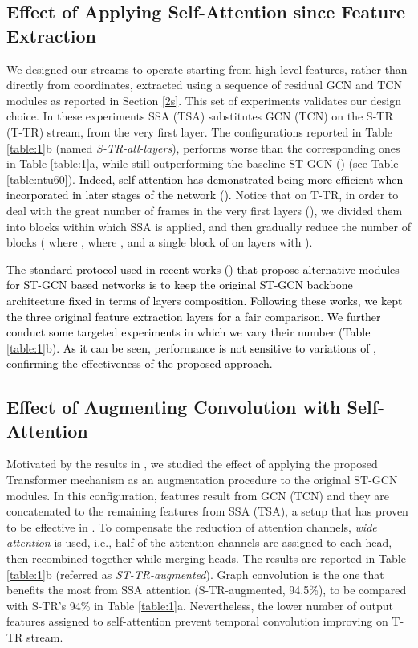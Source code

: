 \documentclass[times,twocolumn,final,authoryear]{elsarticle}
\DeclareRobustCommand{\new}[1]
{{\textcolor{black}{#1}}}
\begin{document}
\setlength{\tabcolsep}{4pt}




\subsection{Effect of Applying Self-Attention since Feature Extraction}
We designed our streams to operate starting from high-level features, rather than directly from coordinates, extracted using a sequence of residual GCN and TCN modules as reported in Section \ref{2s}. This set of experiments validates our design choice. In these experiments SSA (TSA) substitutes GCN (TCN) on the S-TR (T-TR) stream, from the very first layer. The configurations reported in Table \ref{table:1}b (named \textit{S-TR-all-layers}), performs worse than the corresponding ones in Table \ref{table:1}a, while still outperforming the baseline ST-GCN (\cite{dirgraph}) (see Table \ref{table:ntu60}). \new{Indeed, self-attention has demonstrated being more efficient when 
incorporated in later stages of the network (\cite{carion2020end,huang2019ccnet,non-local}).} 
Notice that on T-TR, in order to deal with the great number of frames in the very first layers (), we divided them into blocks within which SSA is applied, and then gradually reduce the number of blocks ( where ,  where , and a single block of  on layers  with ).


\new{The standard protocol used in recent works (\cite{shift,Shi2018TwoStreamAG}) that propose alternative modules for ST-GCN based networks is to keep the original ST-GCN backbone architecture fixed in terms of layers composition. Following these works, we kept the three original feature extraction layers for a fair comparison. We further conduct some targeted experiments in which we vary their number  (Table \ref{table:1}b). As it can be seen, performance is not sensitive to variations of , confirming the effectiveness of the proposed approach.}





\subsection{Effect of Augmenting Convolution with Self-Attention} 
Motivated by the results in \cite{DBLP:journals/corr/abs-1904-09925}, we studied the effect of applying the proposed Transformer mechanism as an augmentation procedure to the original ST-GCN modules. In this configuration,  features result from GCN (TCN) and they are concatenated to the remaining  features from SSA (TSA), a setup that
has proven to be effective in \cite{DBLP:journals/corr/abs-1904-09925}. To compensate the reduction of attention channels, \textit{wide attention} is used, i.e., half of the attention channels are assigned to each head, then recombined together while merging heads. The results are reported in Table \ref{table:1}b (referred as \textit{ST-TR-augmented}). Graph convolution is the one that benefits the most from SSA attention (S-TR-augmented, 94.5\%), to be compared with S-TR's 94\% in Table \ref{table:1}a. Nevertheless, the lower number of output features assigned to self-attention prevent temporal convolution improving on T-TR stream. 
\end{document}
